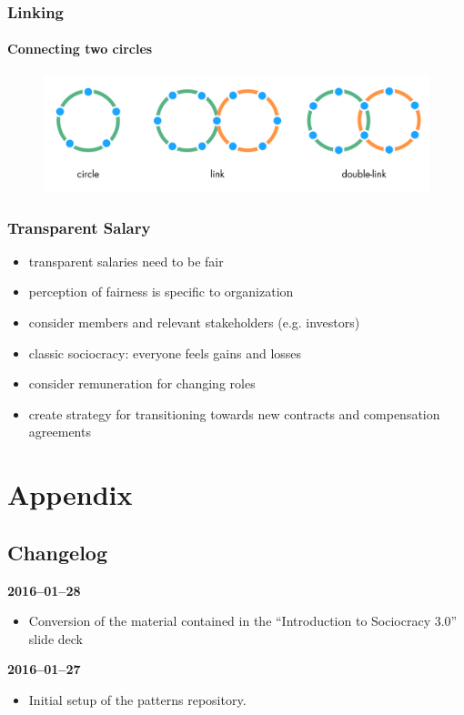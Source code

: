 \section{Linking}
\label{linking}

\subsection{Connecting two circles}
\label{connectingtwocircles}

\begin{figure}[htbp]
\centering
\includegraphics[keepaspectratio,width=\textwidth,height=0.75\textheight]{img/structural-patterns/circles-and-links.png}
\end{figure}

\section{Transparent Salary}
\label{transparentsalary}

\begin{itemize}
\item transparent salaries need to be fair

\item perception of fairness is specific to organization

\item consider members and relevant stakeholders (e.g. investors)

\item classic sociocracy: everyone feels gains and losses

\item consider remuneration for changing roles

\item create strategy for transitioning towards new contracts and compensation agreements

\end{itemize}

\part{Appendix}
\label{appendix}

\chapter{Changelog}
\label{changelog}

\textbf{2016--01--28}

\begin{itemize}
\item Conversion of the material contained in the ``Introduction to Sociocracy 3.0'' slide deck

\end{itemize}

\textbf{2016--01--27}

\begin{itemize}
\item Initial setup of the patterns repository.

\end{itemize}
